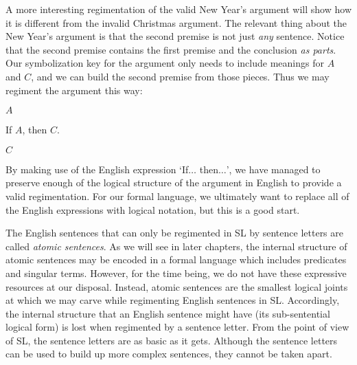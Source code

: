 A more interesting regimentation of the valid New Year's argument will show how it is different from the invalid Christmas argument.
The relevant thing about the New Year's argument is that the second premise is not just \emph{any} sentence.
Notice that the second premise contains the first premise and the conclusion \emph{as parts}.
Our symbolization key for the argument only needs to include meanings for $A$ and $C$, and we can build the second premise from those pieces.
Thus we may regiment the argument this way:

\begin{earg}
\item[] $A$
\item[] If $A$, then $C$.
\item[\therefore] $C$
\end{earg}

By making use of the English expression `If$\ldots$ then$\ldots$', we have managed to preserve enough of the logical structure of the argument in English to provide a valid regimentation.
For our formal language, we ultimately want to replace all of the English expressions with logical notation, but this is a good start.

The English sentences that can only be regimented in SL by sentence letters are called \emph{atomic sentences}.
As we will see in later chapters, the internal structure of atomic sentences may be encoded in a formal language which includes predicates and singular terms.
However, for the time being, we do not have these expressive resources at our disposal.
Instead, atomic sentences are the smallest logical joints at which we may carve while regimenting English sentences in SL.
Accordingly, the internal structure that an English sentence might have (its sub-sentential logical form) is lost when regimented by a sentence letter.
From the point of view of SL, the sentence letters are as basic as it gets.
Although the sentence letters can be used to build up more complex sentences, they cannot be taken apart.



